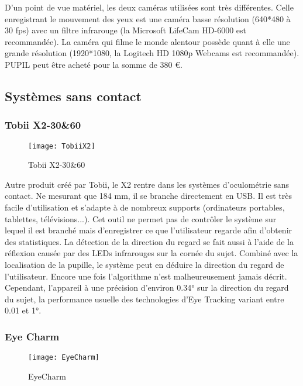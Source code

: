 D’un point de vue matériel, les deux caméras utilisées sont très différentes.
Celle enregistrant le mouvement des yeux est une caméra basse résolution (640*480 à 30 fps) avec un filtre infrarouge (la  Microsoft LifeCam HD-6000 est recommandée). La caméra qui filme le monde alentour possède quant à elle une grande résolution (1920*1080, la Logitech HD 1080p Webcams est recommandée).
PUPIL peut être acheté pour la somme de 380 \euro{}.

\subsection{Systèmes sans contact}

\subsubsection{Tobii X2-30\&60}

\begin{figure}[h]
  \centering
  \texttt{[image: TobiiX2]}
  \caption{Tobii X2-30\&60}
  \label{fig:TobiiX2}
\end{figure}

Autre produit créé par Tobii, le X2 \cite{tobiieyetracker} rentre dans les systèmes d’oculométrie sans contact. Ne mesurant que 184 mm, il se branche directement en USB. Il est très facile d’utilisation et s'adapte à de nombreux supports (ordinateurs portables, tablettes, télévisions...).
Cet outil ne permet pas de contrôler le système sur lequel il est branché mais d’enregistrer ce que l’utilisateur regarde afin d’obtenir des statistiques.
La détection de la direction du regard se fait aussi à l’aide de la réflexion causée par des LEDs infrarouges sur la cornée du sujet. Combiné avec la localisation de la pupille, le système peut en déduire la direction du regard de l’utilisateur. Encore une fois l’algorithme n’est malheureusement jamais décrit. Cependant, l’appareil à une précision d’environ 0.34° sur la direction du regard du sujet, la performance usuelle des technologies d'Eye Tracking variant entre 0.01 et 1°.

\subsubsection{Eye Charm}

\begin{figure}[h]
  \centering
  \texttt{[image: EyeCharm]}
  \caption{EyeCharm}
  \label{fig:EyeCharm}
\end{figure}

